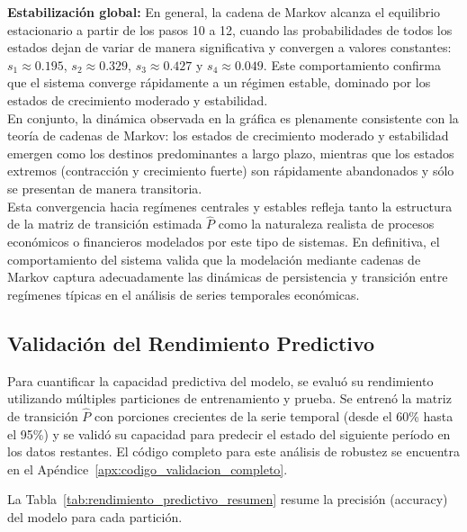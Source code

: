 \begin{examplex}
\noindent
\textbf{Estabilización global:}
En general, la cadena de Markov alcanza el equilibrio estacionario a partir de los pasos 10 a 12, cuando las probabilidades de todos los estados dejan de variar de manera significativa y convergen a valores constantes: \(s_1 \approx 0.195\), \(s_2 \approx 0.329\), \(s_3 \approx 0.427\) y \(s_4 \approx 0.049\). Este comportamiento confirma que el sistema converge rápidamente a un régimen estable, dominado por los estados de crecimiento moderado y estabilidad.\\

En conjunto, la dinámica observada en la gráfica es plenamente consistente con la teoría de cadenas de Markov: los estados de crecimiento moderado y estabilidad emergen como los destinos predominantes a largo plazo, mientras que los estados extremos (contracción y crecimiento fuerte) son rápidamente abandonados y sólo se presentan de manera transitoria. \\

Esta convergencia hacia regímenes centrales y estables refleja tanto la estructura de la matriz de transición estimada \(\hat{P}\) como la naturaleza realista de procesos económicos o financieros modelados por este tipo de sistemas. En definitiva, el comportamiento del sistema valida que la modelación mediante cadenas de Markov captura adecuadamente las dinámicas de persistencia y transición entre regímenes típicas en el análisis de series temporales económicas.

\end{examplex}
\subsection{Validación del Rendimiento Predictivo}
Para cuantificar la capacidad predictiva del modelo, se evaluó su rendimiento utilizando múltiples particiones de entrenamiento y prueba. Se entrenó la matriz de transición \(\hat{P}\) con porciones crecientes de la serie temporal (desde el 60\% hasta el 95\%) y se validó su capacidad para predecir el estado del siguiente período en los datos restantes. El código completo para este análisis de robustez se encuentra en el Apéndice~\ref{apx:codigo_validacion_completo}.

La Tabla~\ref{tab:rendimiento_predictivo_resumen} resume la precisión (accuracy) del modelo para cada partición.

